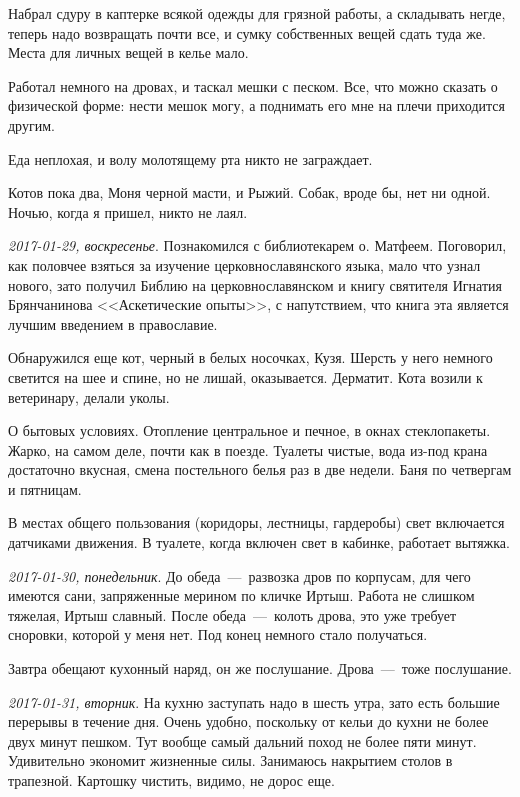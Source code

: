 \documentclass[
    12pt
    ,a4paper
    ,oneside
    ,russian
]{memoir}
\newcommand{\mydatestamp}{
    \bigskip   %
    \emph
}
\newcommand{\mds}{\mydatestamp}
\begin{document}
    Набрал сдуру в каптерке всякой одежды для грязной работы, а складывать негде, теперь надо возвращать почти все, и сумку собственных вещей сдать туда же. Места для личных вещей в келье мало.
    
    Работал немного на дровах, и таскал мешки с песком. Все, что можно сказать о физической форме: нести мешок могу, а поднимать его мне на плечи приходится другим.
    
    Еда неплохая, и волу молотящему рта никто не заграждает.
    
    Котов пока два, Моня черной масти, и Рыжий. Собак, вроде бы, нет ни одной. Ночью, когда я пришел, никто не лаял.
    
    \mds{2017-01-29, воскресенье}. Познакомился с библиотекарем о. Матфеем. Поговорил, как половчее взяться за изучение церковнославянского языка, мало что узнал нового, зато получил Библию на церковнославянском и книгу святителя Игнатия Брянчанинова <<Аскетические опыты>>, с напутствием, что книга эта является лучшим введением в православие.
    
    Обнаружился еще кот, черный в белых носочках, Кузя. Шерсть у него немного светится на шее и спине, но не лишай, оказывается. Дерматит. Кота возили к ветеринару, делали уколы.
    
    О бытовых условиях. Отопление центральное и печное, в окнах стеклопакеты. Жарко, на самом деле, почти как в поезде. Туалеты чистые, вода из-под крана достаточно вкусная, смена постельного белья раз в две недели. Баня по четвергам и пятницам.
    
    В местах общего пользования (коридоры, лестницы, гардеробы) свет включается датчиками движения. В туалете, когда включен свет в кабинке, работает вытяжка.
    
    \mds{2017-01-30, понедельник}. До обеда~---~развозка дров по корпусам, для чего имеются сани, запряженные мерином по кличке Иртыш. Работа не слишком тяжелая, Иртыш славный. После обеда~---~колоть дрова, это уже требует сноровки, которой у меня нет. Под конец немного стало получаться.
    
    Завтра обещают кухонный наряд, он же послушание. Дрова~---~тоже послушание.
    
    \mds{2017-01-31, вторник}. На кухню заступать надо в шесть утра, зато есть большие перерывы в течение дня. Очень удобно, поскольку от кельи до кухни не более двух минут пешком. Тут вообще самый дальний поход не более пяти минут. Удивительно экономит жизненные силы. Занимаюсь накрытием столов в трапезной. Картошку чистить, видимо, не дорос еще.
    
\end{document}
